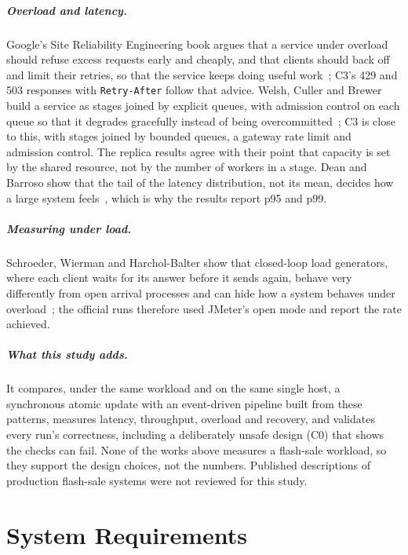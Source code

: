 \documentclass[a4paper]{report}
\begin{document}
\paragraph{Overload and latency.} Google's Site Reliability Engineering book
argues that a service under overload should refuse excess requests early and
cheaply, and that clients should back off and limit their retries, so that the
service keeps doing useful work~\cite{sre-overload}; C3's 429 and 503 responses
with \texttt{Retry-After} follow that advice. Welsh, Culler and Brewer build
a service as stages joined by explicit queues, with admission control on each
queue so that it degrades gracefully instead of being
overcommitted~\cite{welsh-seda}; C3 is close to this, with stages joined by
bounded queues, a gateway rate limit and admission control. The replica results
agree with their point that capacity is set by the shared resource, not by the
number of workers in a stage. Dean and Barroso show that the tail
of the latency distribution, not its mean, decides how a large system
feels~\cite{dean-tail}, which is why the results report p95 and p99.

\paragraph{Measuring under load.} Schroeder, Wierman and Harchol-Balter show
that closed-loop load generators, where each client waits for its answer
before it sends again, behave very differently from open arrival processes and
can hide how a system behaves under overload~\cite{schroeder-open-closed}; the
official runs therefore used JMeter's open mode and report the rate achieved.

\paragraph{What this study adds.} It compares, under the same workload and on
the same single host, a synchronous atomic update with an event-driven
pipeline built from these patterns, measures latency, throughput, overload and
recovery, and validates every run's correctness, including a deliberately
unsafe design (C0) that shows the checks can fail. None of the works above
measures a flash-sale workload, so they support the design choices, not the
numbers. Published descriptions of production flash-sale systems were not
reviewed for this study.

\chapter{System Requirements}
\label{sec:requirements}
\end{document}
